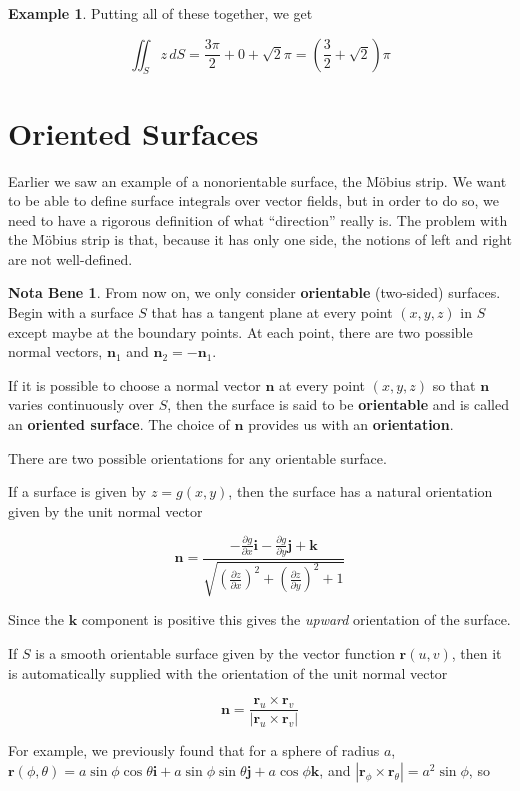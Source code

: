 \documentclass[11pt,oneside,english]{amsart}
\theoremstyle{definition}
\newtheorem*{example}{Example}
\newtheorem*{note}{Nota Bene}
\newcommand{\pp}[2]{\frac{\partial{#1}}{\partial{#2}}}
\begin{document}
\begin{example}
Putting all of these together, we get

\[
\iint_Sz\,dS=\frac{3\pi}{2}+0+\sqrt{2}\pi=\left(\frac{3}{2}+\sqrt{2}\right)\pi
\]
\end{example}

\section*{Oriented Surfaces}

Earlier we saw an example of a nonorientable surface, the M\"{o}bius strip. We want to be able to define surface integrals over vector fields, but in order to do so, we need to have a rigorous definition of what ``direction'' really is. The problem with the M\"{o}bius strip is that, because it has only one side, the notions of left and right are not well-defined.

\begin{note}
From now on, we only consider \textbf{orientable} (two-sided) surfaces. Begin with a surface $S$ that has a tangent plane at every point $(x,y,z)$ in $S$ except maybe at the boundary points. At each point, there are two possible normal vectors, $\mathbf{n}_1$ and $\mathbf{n}_2=-\mathbf{n}_1$.

If it is possible to choose a normal vector $\mathbf{n}$ at every point $(x,y,z)$ so that $\mathbf{n}$ varies continuously over $S$, then the surface is said to be \textbf{orientable} and is called an \textbf{oriented surface}. The choice of $\mathbf{n}$ provides us with an \textbf{orientation}.

There are two possible orientations for any orientable surface.
\end{note}

If a surface is given by $z=g(x,y)$, then the surface has a natural orientation given by the unit normal vector

\[
\mathbf{n}=\frac{-\pp{g}{x}\mathbf{i}-\pp{g}{y}\mathbf{j}+\mathbf{k}}{\sqrt{\left(\pp{z}{x}\right)^2+\left(\pp{z}{y}\right)^2+1}}
\]

Since the $\mathbf{k}$ component is positive this gives the \textit{upward} orientation of the surface.

If $S$ is a smooth orientable surface given by the vector function $\mathbf{r}(u,v)$, then it is automatically supplied with the orientation of the unit normal vector

\[
\mathbf{n}=\frac{\mathbf{r}_u\times\mathbf{r}_v}{|\mathbf{r}_u\times\mathbf{r}_v|}
\]

For example, we previously found that for a sphere of radius $a$, $\mathbf{r}(\phi,\theta)=a\sin\phi\cos\theta\mathbf{i}+a\sin\phi\sin\theta\mathbf{j}+a\cos\phi\mathbf{k}$, and $|\mathbf{r}_\phi\times\mathbf{r}_\theta|=a^2\sin\phi$, so
\end{document}
